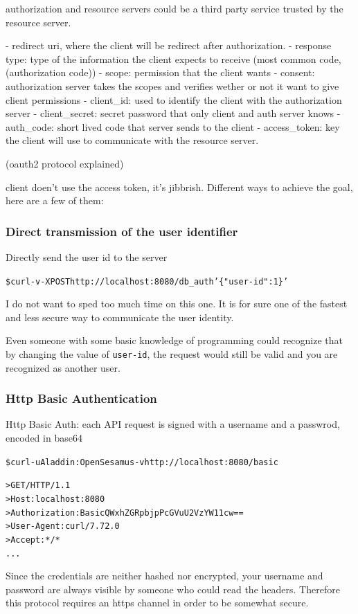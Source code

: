\documentclass[20pt]{style}
\begin{document}
authorization and resource servers could be a third party service trusted by the
resource server.

- redirect uri, where the client will be redirect after authorization.
- response type: type of the information the client expects to receive (most
common code, (authorization code))
- scope: permission that the client wants
- consent: authorization server takes the scopes and verifies wether or not it
want to give client permissions
- client\_id: used to identify the client with the authorization server
- client\_secret: secret password that only client and auth server knows
- auth\_code: short lived code that server sends to the client
- access\_token: key the client will use to communicate with the resource server.

(oauth2 protocol explained)

client doen't use the access token, it's jibbrish.
Different ways to achieve the goal, here are a few of them:
\subsubsection{Direct transmission of the user identifier}
Directly send the user id to the server
\begin{alltt}
    \$ curl -v -X POST http://localhost:8080/db_auth '\{"user-id": 1\}'
\end{alltt}
I do not want to sped too much time on this one. It is for sure one of the
fastest
and less secure way to communicate the user identity.

Even someone with some basic knowledge of programming could recognize that by changing the
value of \texttt{user-id}, the request would still be valid and you are recognized as
another user.

\subsubsection{Http Basic Authentication}
Http Basic Auth: each API request is signed with a username and a passwrod, encoded in base64
\begin{alltt}
    \$ curl -u Aladdin:OpenSesamus -v http://localhost:8080/basic

    > GET / HTTP/1.1
    > Host: localhost:8080
    > Authorization: Basic QWxhZGRpbjpPcGVuU2VzYW11cw==
    > User-Agent: curl/7.72.0
    > Accept: */*
    ...
\end{alltt}
Since the credentials are neither hashed nor encrypted, your username and password are always visible by
someone who could read the headers.
Therefore this protocol requires an https channel in order to be somewhat secure.
\end{document}
